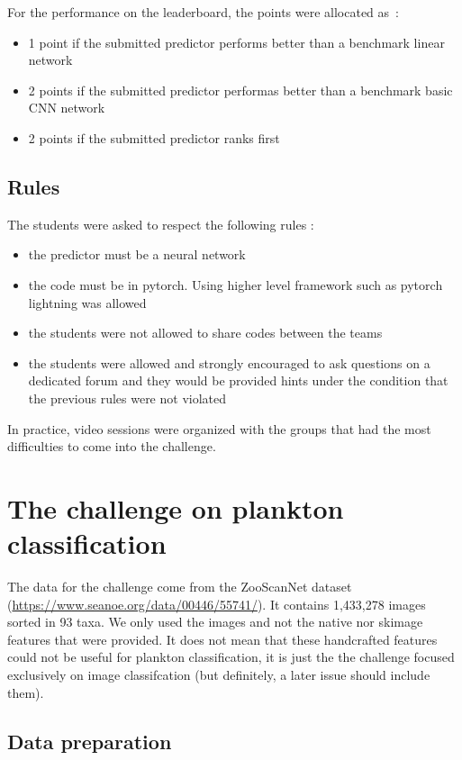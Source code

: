 \documentclass{article}
\begin{document}
For the performance on the leaderboard, the points were allocated as~:
\begin{itemize}
	\item 1 point if the submitted predictor performs better than a benchmark linear network
	\item 2 points if the submitted predictor performas better than a benchmark basic CNN network
	\item 2 points if the submitted predictor ranks first
\end{itemize}

\subsection{Rules}

The students were asked to respect the following rules :
\begin{itemize}
	\item the predictor must be a neural network
	\item the code must be in pytorch. Using higher level framework such as pytorch lightning was allowed
	\item the students were not allowed to share codes between the teams
	\item the students were allowed and strongly encouraged to ask questions on a dedicated forum and they would be provided hints under the condition that the previous rules were not violated
\end{itemize}

In practice, video sessions were organized with the groups that had the most difficulties to come into the challenge.


\section{The challenge on plankton classification}

The data for the challenge come from the ZooScanNet dataset (\url{https://www.seanoe.org/data/00446/55741/}). It contains 1,433,278 images sorted in 93 taxa. We only used the images and not the native nor skimage features that were provided. It does not mean that these handcrafted features could not be useful for plankton classification, it is just the the challenge focused exclusively on image classifcation (but definitely, a later issue should include them).

\subsection{Data preparation}
\end{document}
